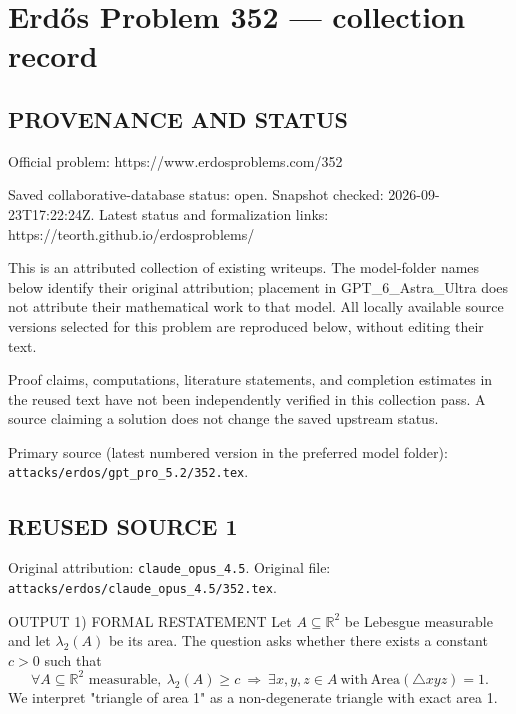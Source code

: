 \section*{Erd\H{o}s Problem 352 --- collection record}

\subsection*{PROVENANCE AND STATUS}
Official problem: https://www.erdosproblems.com/352

Saved collaborative-database status: open.
Snapshot checked: 2026-09-23T17:22:24Z.
Latest status and formalization links: https://teorth.github.io/erdosproblems/

This is an attributed collection of existing writeups. The model-folder names below identify their original attribution; placement in GPT\_6\_Astra\_Ultra does not attribute their mathematical work to that model. All locally available source versions selected for this problem are reproduced below, without editing their text.

Proof claims, computations, literature statements, and completion estimates in the reused text have not been independently verified in this collection pass. A source claiming a solution does not change the saved upstream status.

Primary source (latest numbered version in the preferred model folder): \texttt{attacks/erdos/gpt\_pro\_5.2/352.tex}.

\subsection*{REUSED SOURCE 1}
Original attribution: \texttt{claude\_opus\_4.5}.
Original file: \texttt{attacks/erdos/claude\_opus\_4.5/352.tex}.


OUTPUT
1) FORMAL RESTATEMENT
Let $A\subseteq\mathbb{R}^2$ be Lebesgue measurable and let $\lambda_2(A)$ be its area.
The question asks whether there exists a constant $c>0$ such that
\[
\forall A\subseteq\mathbb{R}^2 \text{ measurable},\ \lambda_2(A)\ge c\ \Rightarrow\ \exists x,y,z\in A\ \text{with}\ \text{Area}(\triangle xyz)=1.
\]
We interpret "triangle of area 1" as a non-degenerate triangle with exact area 1.

